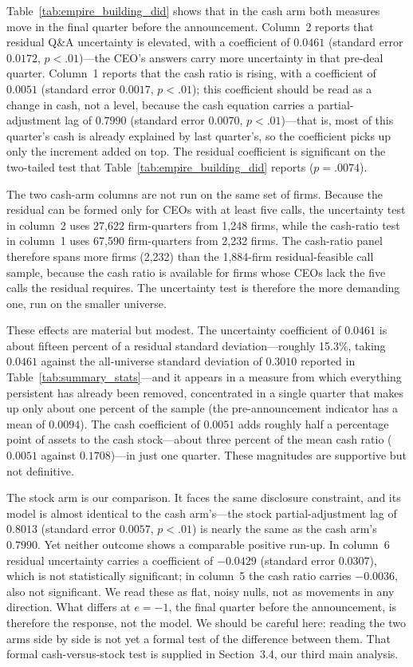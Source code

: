 Table~\ref{tab:empire_building_did} shows that in the cash arm both measures move in the final quarter before the announcement. Column~2 reports that residual Q\&A uncertainty is elevated, with a coefficient of $0.0461$ (standard error $0.0172$, $p<.01$)---the CEO's answers carry more uncertainty in that pre-deal quarter. Column~1 reports that the cash ratio is rising, with a coefficient of $0.0051$ (standard error $0.0017$, $p<.01$); this coefficient should be read as a change in cash, not a level, because the cash equation carries a partial-adjustment lag of $0.7990$ (standard error $0.0070$, $p<.01$)---that is, most of this quarter's cash is already explained by last quarter's, so the coefficient picks up only the increment added on top. The residual coefficient is significant on the two-tailed test that Table~\ref{tab:empire_building_did} reports ($p=.0074$).

The two cash-arm columns are not run on the same set of firms. Because the residual can be formed only for CEOs with at least five calls, the uncertainty test in column~2 uses 27,622 firm-quarters from 1,248 firms, while the cash-ratio test in column~1 uses 67,590 firm-quarters from 2,232 firms. The cash-ratio panel therefore spans more firms (2,232) than the 1,884-firm residual-feasible call sample, because the cash ratio is available for firms whose CEOs lack the five calls the residual requires. The uncertainty test is therefore the more demanding one, run on the smaller universe.

These effects are material but modest. The uncertainty coefficient of $0.0461$ is about fifteen percent of a residual standard deviation---roughly 15.3\%, taking $0.0461$ against the all-universe standard deviation of $0.3010$ reported in Table~\ref{tab:summary_stats}---and it appears in a measure from which everything persistent has already been removed, concentrated in a single quarter that makes up only about one percent of the sample (the pre-announcement indicator has a mean of $0.0094$). The cash coefficient of $0.0051$ adds roughly half a percentage point of assets to the cash stock---about three percent of the mean cash ratio ($0.0051$ against $0.1708$)---in just one quarter. These magnitudes are supportive but not definitive.

The stock arm is our comparison. It faces the same disclosure constraint, and its model is almost identical to the cash arm's---the stock partial-adjustment lag of $0.8013$ (standard error $0.0057$, $p<.01$) is nearly the same as the cash arm's $0.7990$. Yet neither outcome shows a comparable positive run-up. In column~6 residual uncertainty carries a coefficient of $-0.0429$ (standard error $0.0307$), which is not statistically significant; in column~5 the cash ratio carries $-0.0036$, also not significant. We read these as flat, noisy nulls, not as movements in any direction. What differs at $e=-1$, the final quarter before the announcement, is therefore the response, not the model. We should be careful here: reading the two arms side by side is not yet a formal test of the difference between them. That formal cash-versus-stock test is supplied in Section~3.4, our third main analysis.


